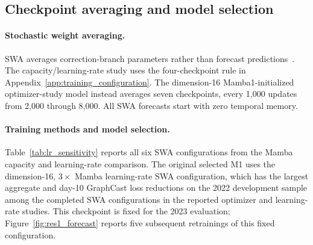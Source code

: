 \documentclass{article}
\newcommand{\vfourchange}[1]{{\color{blue}#1}}
\newif\ifvfivechanges
\begin{document}
\subsection{\texorpdfstring{{Checkpoint averaging and model selection}}{Checkpoint averaging and model selection}}
\label{app:checkpoint_selection}
\begin{samepage}
\paragraph{Stochastic weight averaging.}
\ifvfivechanges
\par\begingroup\color{vfiveDeleted}\noindent
\sout{SWA averages correction-branch parameter values from saved checkpoints to reduce dependence on a single training iterate \mbox{\citep{izmailov2019averagingweightsleadswider}}. Every configuration in Table~\mbox{\ref{tab:lr_sensitivity}} averages four checkpoints at post-warm-up updates 500, 1,000, 1,500, and 2,000. The dimension-16 Mamba1-initialized optimizer-study configuration described above averages seven checkpoints, saved every 1k updates from 2k through 8k. These are parameter averages, not ensembles of independent forecast predictions. Evaluation initializes the temporal memory state to zero, including for SWA models.}
\par\endgroup
\fi
\vfourchange{SWA averages correction-branch parameters rather than forecast predictions~\citep{izmailov2019averagingweightsleadswider}. The capacity/learning-rate study uses the four-checkpoint rule in Appendix~\ref{app:training_configuration}. The dimension-16 Mamba1-initialized optimizer-study model instead averages seven checkpoints, every 1,000 updates from 2,000 through 8,000. All SWA forecasts start with zero temporal memory.}
\end{samepage}

\paragraph{Training methods and model selection.}
Table~\ref{tab:lr_sensitivity} reports all six SWA configurations from the Mamba capacity and learning-rate comparison. \vfourchange{The original selected M1 uses} the dimension-16, $3\times$ Mamba learning-rate SWA configuration, which has the largest aggregate and day-10 {GraphCast loss} reductions \vfourchange{on the 2022 development sample} among the completed SWA configurations in the reported optimizer and learning-rate studies. \vfourchange{This checkpoint is fixed for the 2023 evaluation; Figure~\ref{fig:res1_forecast} reports five subsequent retrainings of this fixed configuration.}
\end{document}

